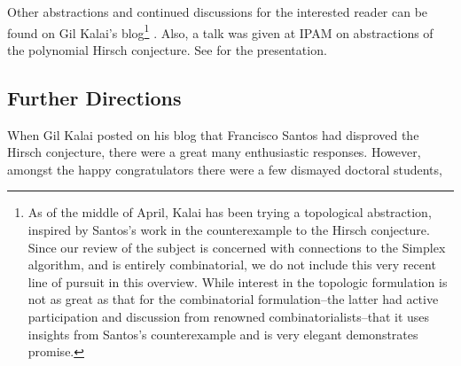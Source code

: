 \documentclass[11pt,a4paper]{article}
\theoremstyle{definition}
\begin{document}
Other abstractions and continued discussions for the interested reader can be found on Gil Kalai's blog\footnote{As of the middle of April, Kalai has been trying a topological abstraction, inspired by Santos's work in the counterexample to the Hirsch conjecture. Since our review of the subject is concerned with connections to the Simplex algorithm, and is entirely combinatorial, we do not include this very recent line of pursuit in this overview. While interest in the topologic formulation is not as great as that for the combinatorial formulation--the latter had active participation and discussion from renowned combinatorialists--that it uses insights from Santos's counterexample and is very elegant demonstrates promise.} \citep{kalaiblog}. Also, a talk was given at IPAM on abstractions of the polynomial Hirsch conjecture. See \citet{hahn10} for the presentation.

\subsection{Further Directions}

When Gil Kalai posted on his blog that Francisco Santos had disproved the Hirsch conjecture, there were a great many enthusiastic responses. However, amongst the happy congratulators there were a few dismayed doctoral students,
\end{document}
